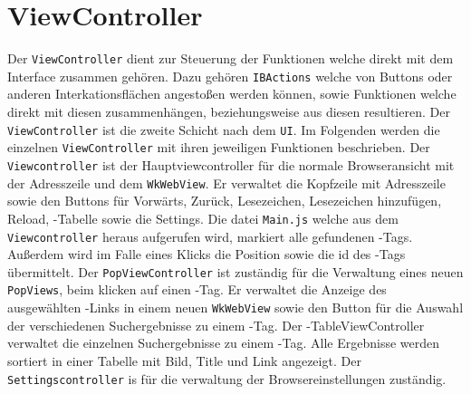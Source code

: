 
\section{ViewController}
Der \lstinline|ViewController| dient zur Steuerung der Funktionen welche direkt mit dem Interface zusammen gehören. Dazu gehören
\lstinline|IBActions| welche von Buttons oder anderen Interkationsflächen angestoßen werden können, sowie Funktionen welche direkt mit diesen zusammenhängen, beziehungsweise aus diesen resultieren. Der \lstinline|ViewController| ist die zweite Schicht nach dem \lstinline|UI|. Im
Folgenden werden die einzelnen \lstinline|ViewController| mit ihren jeweiligen Funktionen beschrieben.
Der \lstinline|Viewcontroller| ist der Hauptviewcontroller für die normale Browseransicht mit der Adresszeile und dem \lstinline|WkWebView|. Er verwaltet die Kopfzeile mit Adresszeile sowie den Buttons für Vorwärts, Zurück, Lesezeichen, Lesezeichen hinzufügen, Reload, \SECH-Tabelle sowie die Settings. Die datei \lstinline|Main.js| welche aus dem \lstinline|Viewcontroller| heraus aufgerufen wird, markiert alle gefundenen \SEARCH-Tags. Außerdem wird im Falle eines Klicks die Position sowie die id des \SEARCH-Tags übermittelt.
Der \lstinline|PopViewController| ist zuständig für die Verwaltung eines neuen \lstinline|PopViews|, beim klicken auf einen \SEARCH-Tag. Er verwaltet die Anzeige des ausgewählten \Search-Links in einem neuen \lstinline|WkWebView| sowie den Button für die Auswahl der verschiedenen Suchergebnisse zu einem \Search-Tag.
Der \Search-TableViewController verwaltet die einzelnen Suchergebnisse zu einem \Search-Tag. Alle Ergebnisse werden sortiert in einer Tabelle mit Bild, Title und Link angezeigt.
Der \lstinline|Settingscontroller| is für die verwaltung der Browsereinstellungen zuständig.


